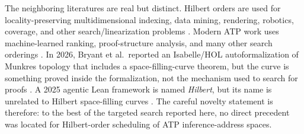 \documentclass[11pt]{article}
\theoremstyle{hilberttheorem}
\begin{document}
The neighboring literatures are real but distinct. Hilbert orders are used for locality-preserving multidimensional indexing, data mining, rendering, robotics, coverage, and other search/linearization problems \cite{skilling2004,haverkort2017,joshi2019,wakode2022,bohm2020,gotsman1996}. Modern ATP work uses machine-learned ranking, proof-structure analysis, and many other search orderings \cite{faerber2021,wernhard2024}. In 2026, Bryant et al.~reported an Isabelle/HOL autoformalization of Munkres topology that includes a space-filling-curve theorem, but the curve is something proved inside the formalization, not the mechanism used to search for proofs \cite{bryant2026}. A 2025 agentic Lean framework is named \emph{Hilbert}, but its name is unrelated to Hilbert space-filling curves \cite{varambally2025}. The careful novelty statement is therefore: to the best of the targeted search reported here, no direct precedent was located for Hilbert-order scheduling of ATP inference-address spaces.
\end{document}
